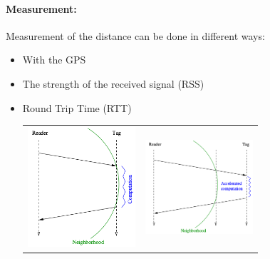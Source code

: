 \paragraph{Measurement:}
Measurement of the distance can be done in different ways:
\begin{itemize}
    \item With the GPS
    \item The strength of the received signal (RSS)
    \item Round Trip Time (RTT)
        \begin{center}
        \begin{tabular}{m{6cm}m{6cm}}
            \centering
            \includegraphics[width=4cm]{img/RTT}
            &
            \centering
            \includegraphics[width=4cm]{img/RTT2}
        \end{tabular}
        \end{center}
\end{itemize}


